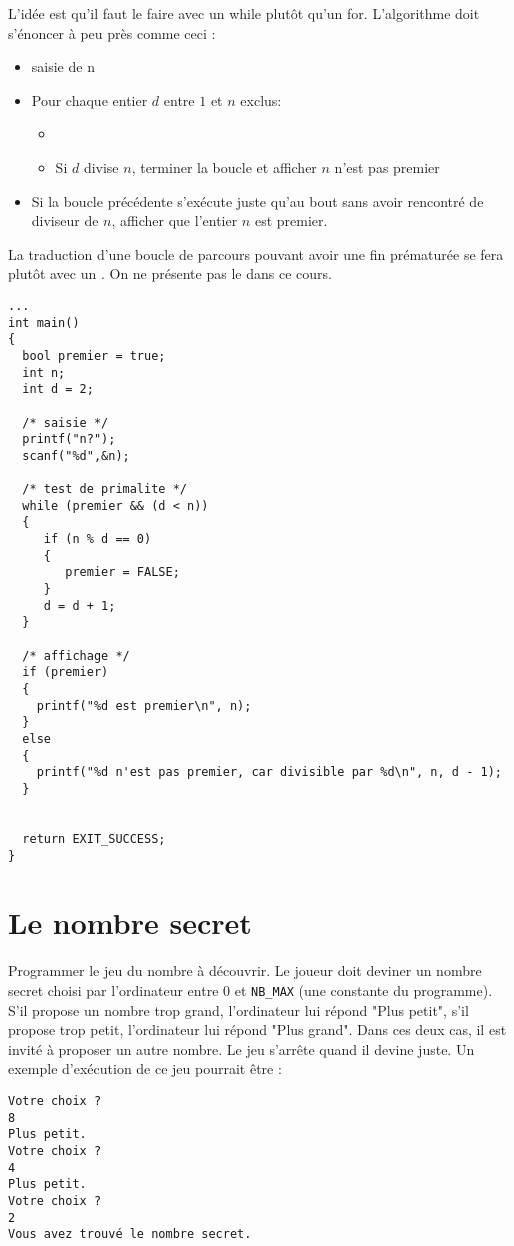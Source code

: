 \begin{correction}
L'idée est qu'il faut le faire avec un while plutôt qu'un
for. L'algorithme doit s'énoncer à peu près comme ceci :
\begin{itemize}
\item saisie de n
\item Pour chaque entier $d$ entre $1$ et $n$ exclus:
  \begin{itemize}
  \item \item Si $d$ divise $n$, terminer la boucle et afficher $n$
    n'est pas premier
  \end{itemize}
\item Si la boucle précédente s'exécute juste qu'au bout sans avoir
  rencontré de diviseur de $n$, afficher que l'entier $n$ est premier.
\end{itemize}
La traduction d'une boucle de parcours pouvant avoir une fin prématurée se fera
plutôt avec un . On ne présente pas le  dans ce cours.
\begin{verbatim}
...
int main()
{
  bool premier = true;
  int n;
  int d = 2;

  /* saisie */
  printf("n?");
  scanf("%d",&n);

  /* test de primalite */
  while (premier && (d < n))
  {
     if (n % d == 0)
     {
        premier = FALSE;
     }
     d = d + 1;
  }

  /* affichage */
  if (premier)
  {
    printf("%d est premier\n", n);
  }
  else
  {
    printf("%d n'est pas premier, car divisible par %d\n", n, d - 1);
  }


  return EXIT_SUCCESS;
}
\end{verbatim}
\end{correction}


\section{Le nombre secret}

Programmer le jeu du nombre à découvrir. Le joueur doit
deviner un nombre secret choisi par l'ordinateur entre 0 et \verb|NB_MAX| (une constante du programme). S'il propose un nombre trop
grand, l'ordinateur lui répond "Plus petit", s'il propose trop petit, l'ordinateur lui répond "Plus grand". Dans ces deux cas, il
est invité à proposer un autre nombre. Le jeu s'arrête quand il devine juste.
Un exemple d'exécution de ce jeu pourrait être :
\begin{verbatim}
Votre choix ?
8
Plus petit.
Votre choix ?
4
Plus petit.
Votre choix ?
2
Vous avez trouvé le nombre secret.
\end{verbatim}

